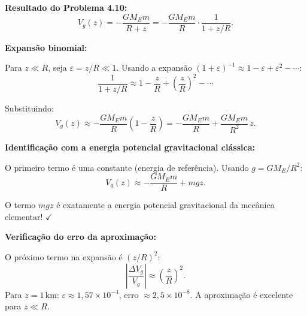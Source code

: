 \textbf{Resultado do Problema 4.10:}
\[
V_g(z)=-\frac{GM_E m}{R+z}=-\frac{GM_E m}{R}\cdot\frac{1}{1+z/R}.
\]

\textbf{Expansão binomial:}

Para $z\ll R$, seja $\varepsilon=z/R\ll1$. Usando a expansão $(1+\varepsilon)^{-1}\approx1-\varepsilon+\varepsilon^2-\cdots$:
\[
\frac{1}{1+z/R}\approx 1 - \frac{z}{R} + \left(\frac{z}{R}\right)^2-\cdots
\]

Substituindo:
\[
V_g(z) \approx -\frac{GM_E m}{R}\left(1 - \frac{z}{R}\right) = -\frac{GM_E m}{R} + \frac{GM_E m}{R^{2}}\,z.
\]

\textbf{Identificação com a energia potencial gravitacional clássica:}

O primeiro termo é uma constante (energia de referência). Usando $g=GM_E/R^2$:
\[
V_g(z) \approx -\frac{GM_E m}{R} + mgz.
\]

O termo $mgz$ é exatamente a energia potencial gravitacional da mecânica elementar! $\checkmark$

\textbf{Verificação do erro da aproximação:}

O próximo termo na expansão é $(z/R)^2$:
\[
\left|\frac{\Delta V_g}{V_g}\right|\approx\left(\frac{z}{R}\right)^2.
\]
Para $z=1\,\mathrm{km}$: $\varepsilon\approx1{,}57\times10^{-4}$, erro $\approx2{,}5\times10^{-8}$. A aproximação é excelente para $z\ll R$.